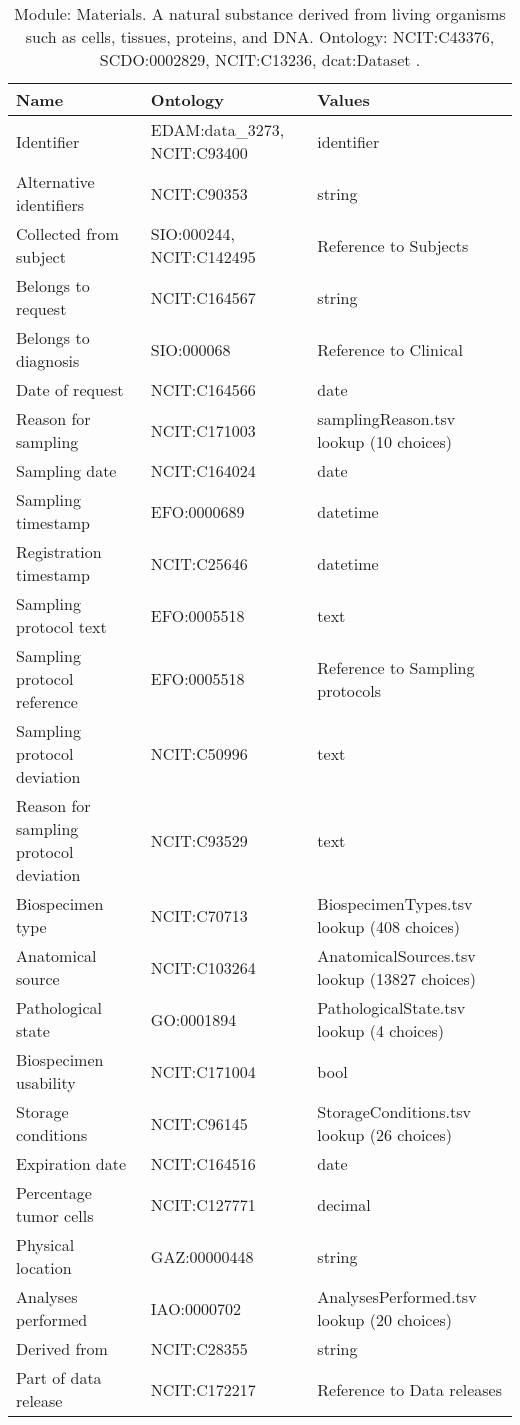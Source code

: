 \documentclass{article}
\begin{document}
\begin{table}[htb]
\begin{tabular}{lll}
Name & Ontology & Values \\
\hline
Identifier & EDAM:data\_3273, NCIT:C93400  & identifier \\
Alternative identifiers & NCIT:C90353  & string \\
Collected from subject & SIO:000244, NCIT:C142495  & Reference to Subjects \\
Belongs to request & NCIT:C164567  & string \\
Belongs to diagnosis & SIO:000068  & Reference to Clinical \\
Date of request & NCIT:C164566  & date \\
Reason for sampling & NCIT:C171003  & samplingReason.tsv lookup (10 choices) \\
Sampling date & NCIT:C164024  & date \\
Sampling timestamp & EFO:0000689  & datetime \\
Registration timestamp & NCIT:C25646  & datetime \\
Sampling protocol text & EFO:0005518  & text \\
Sampling protocol reference & EFO:0005518  & Reference to Sampling protocols \\
Sampling protocol deviation & NCIT:C50996  & text \\
Reason for sampling protocol deviation & NCIT:C93529  & text \\
Biospecimen type & NCIT:C70713  & BiospecimenTypes.tsv lookup (408 choices) \\
Anatomical source & NCIT:C103264  & AnatomicalSources.tsv lookup (13827 choices) \\
Pathological state & GO:0001894  & PathologicalState.tsv lookup (4 choices) \\
Biospecimen usability & NCIT:C171004  & bool \\
Storage conditions & NCIT:C96145  & StorageConditions.tsv lookup (26 choices) \\
Expiration date & NCIT:C164516  & date \\
Percentage tumor cells & NCIT:C127771  & decimal \\
Physical location & GAZ:00000448  & string \\
Analyses performed & IAO:0000702  & AnalysesPerformed.tsv lookup (20 choices) \\
Derived from & NCIT:C28355  & string \\
Part of data release & NCIT:C172217  & Reference to Data releases \\
\hline
\end{tabular}
\caption[Module: Materials]{\label{table:table7} Module: Materials. A natural substance derived from living organisms such as cells, tissues, proteins, and DNA. Ontology: NCIT:C43376, SCDO:0002829, NCIT:C13236, dcat:Dataset . }
\end{table}
\end{document}

